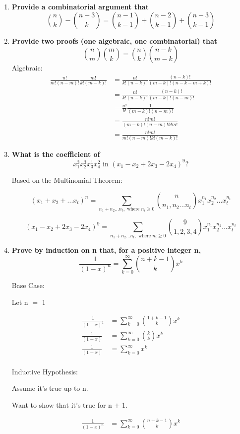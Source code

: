 \documentclass{article}
\newcommand{\mt}[1]{\ensuremath{#1}}
\newcommand{\ps}{\mt{+} }
\newcommand{\gre}{\mt{\geq} }
\newcommand{\eql}{\mt{=} }
\newcommand{\nck}[2]{\mt{{#1 \choose #2}}}
\newcommand{\eqn}[1]{\[#1\]}
\newcommand{\splt}[1]{\begin{split}#1\end{split}}
\newcommand{\smm}[2]{ \mt{\sum_{#1}^{#2}}}
\begin{document}
\begin{enumerate}
  \item \textbf{Provide a combinatorial argument that}
  \eqn{\nck{n}{k} - \nck{n - 3}{k} = \nck{n - 1}{k - 1} + \nck{n - 2}{k - 1} \ps \nck{n - 3}{k - 1}}
  
  
  
  
  \item \textbf{Provide two proofs (one algebraic, one combinatorial) that}
  \eqn{\nck{n}{m} \nck{m}{k} = \nck{n}{k} \nck{n - k}{m - k}}
  Algebraic:
  \eqn{
  	\splt{
  		\frac{n!}{m!(n - m)!}\frac{m!}{k!(m - k)!} & = \frac{n!}{k!(n - k)!}\frac{(n - k)!}{(m - k)!(n - k - m + k)!} \\
  		& = \frac{n!}{k!(n - k)!}\frac{(n - k)!}{(m - k)!(n - m)!} \\
  		& = \frac{n!}{k!}\frac{1}{(m - k)!(n - m)!}	\\
  		& = \frac{n!m!}{(m - k)!(n - m)!k!m!} \\
  		& = \frac{n!m!}{m!(n - m)!k!(m - k)!} 
  	}
  }
  
  
  
  
  \item \textbf{What is the coefficient of}
  \eqn{x_1^3x_2^3x_3^1x_4^2 \textrm{ in } (x_1 - x_2 + 2x_3 - 2x_4)^9?}
  
  Based on the Multinomial Theorem:
  
  \eqn{(x_1 + x_2 + ... x_t)^n = \smm{n_1 + n_2 ... n_t, \textrm{ where } n_i \gre 0}{} \nck{n}{n_1, n_2 ... n_t} x_1^{n_1}x_2^{n_2}...x_t^{n_t}}
  
  \eqn{(x_1 - x_2 + 2x_3 - 2x_4)^9 = \smm{n_1 + n_2 ... n_t, \textrm{ where } n_i \gre 0}{} \nck{9}{1, 2, 3, 4} x_1^{n_1}x_2^{n_2}...x_t^{n_t}}
  
  
  \item \textbf{Prove by induction on n that, for a positive integer n,}
  \eqn{\frac{1}{(1 - x)^n} = \smm{k = 0}{\infty} \nck{n + k - 1}{k}x^k}
  
  Base Case:
  
  Let n \eql 1
  
  \eqn{
  		\splt{
  			\frac{1}{(1 - x)^1} & = \smm{k = 0}{\infty} \nck{1 + k - 1}{k}x^k \\
  			\frac{1}{(1 - x)} & = \smm{k = 0}{\infty} \nck{k}{k}x^k \\
  			\frac{1}{(1 - x)} & = \smm{k = 0}{\infty} x^k \\
  		}
  	}
  
  Inductive Hypothesis:
  
  Assume it's true up to n.
  
  Want to show that it's true for n \ps 1.
  
  \eqn{
  		\splt{
  			\frac{1}{(1 - x)^n} & = \smm{k = 0}{\infty} \nck{n + k - 1}{k}x^k \\
  		}
  	}
  
  
\end{enumerate}
\end{document}
